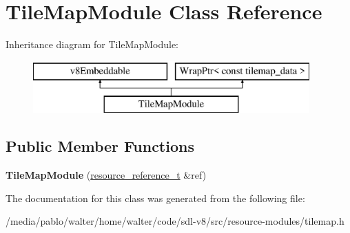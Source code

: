 \hypertarget{classTileMapModule}{}\section{Tile\+Map\+Module Class Reference}
\label{classTileMapModule}
Inheritance diagram for Tile\+Map\+Module\+:\begin{figure}[H]
\begin{center}
\leavevmode
\includegraphics[height=2.000000cm]{classTileMapModule}
\end{center}
\end{figure}
\subsection*{Public Member Functions}
\begin{DoxyCompactItemize}
\item 
\mbox{\label{classTileMapModule_a4dfb5ff4eb3b15b405caabb76a81bcba}} 
{\bfseries Tile\+Map\+Module} (\mbox{\hyperlink{classWrapPtr}{resource\+\_\+reference\+\_\+t}} \&ref)
\end{DoxyCompactItemize}


The documentation for this class was generated from the following file\+:\begin{DoxyCompactItemize}
\item 
/media/pablo/walter/home/walter/code/sdl-\/v8/src/resource-\/modules/tilemap.\+h\end{DoxyCompactItemize}
